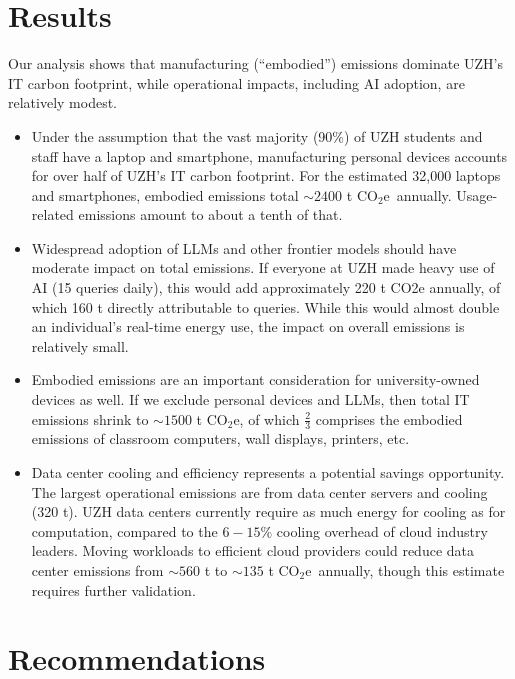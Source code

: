 \documentclass[11pt]{article}
\newcommand{\coe}{CO$_2$e}
\begin{document}
\section{Results}
\label{sec:results}

Our analysis shows that manufacturing (“embodied”) emissions dominate UZH's IT carbon footprint, while operational impacts, including AI adoption, are relatively modest.

\begin{itemize}

\item Under the assumption that the vast majority (90\%) of UZH students and staff have a laptop and smartphone, manufacturing personal devices accounts for over half of UZH's IT carbon footprint. For the estimated 32,000 laptops and smartphones, embodied emissions total $\sim 2400$ t \coe\ annually. Usage-related emissions amount to about a tenth of that.

\item Widespread adoption of LLMs and other frontier models should have moderate impact on total emissions. If everyone at UZH made heavy use of AI (15 queries daily), this would add approximately 220 t CO2e annually, of which 160 t directly attributable to queries. While this would almost double an individual's real-time energy use, the impact on overall emissions is relatively small.

\item Embodied emissions are an important consideration for university-owned devices as well. If we exclude personal devices and LLMs, then total IT emissions shrink to $\sim 1500$ t \coe, of which $\frac{2}{3}$ comprises the embodied emissions of classroom computers, wall displays, printers, etc.

\item Data center cooling and efficiency represents a potential savings opportunity. The largest operational emissions are from data center servers and cooling (320 t). UZH data centers currently require as much energy for cooling as for computation, compared to the $6-15\%$ cooling overhead of cloud industry leaders. Moving workloads to efficient cloud providers could reduce data center emissions from $\sim 560$ t to $\sim 135$ t \coe\ annually, though this estimate requires further validation.

\end{itemize}

\section{Recommendations}
\label{sec:recommendations}
\end{document}
